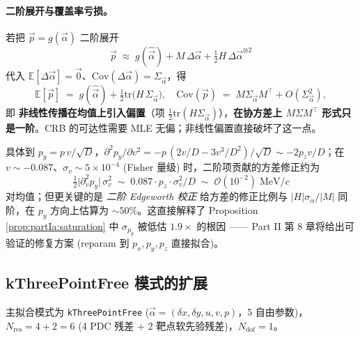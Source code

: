 \paragraph{二阶展开与覆盖率亏损。}
若把 $\vec p=g(\vec\alpha)$ 二阶展开
\begin{equation}
  \vec p \;\approx\; g(\hat{\vec\alpha}) + M\,\Delta\vec\alpha + \tfrac12 H\,\Delta\vec\alpha^{\otimes 2}
\end{equation}
代入 $\mathbb E[\Delta\vec\alpha]=\vec 0$、$\mathrm{Cov}(\Delta\vec\alpha)=\Sigma_{\vec\alpha}$，得
\begin{equation}
  \mathbb E[\vec p] \;=\; g(\hat{\vec\alpha}) + \tfrac12\mathrm{tr}\!\bigl(H\,\Sigma_{\vec\alpha}\bigr),
  \quad
  \mathrm{Cov}(\vec p)\;=\;M\Sigma_{\vec\alpha}M^\top + O(\Sigma_{\vec\alpha}^2),
  \label{eq:partIa:fisher:nonlin_bias}
\end{equation}
即 \textbf{非线性传播在均值上引入偏置}（项 $\tfrac12\mathrm{tr}(H\Sigma_{\vec\alpha})$），\textbf{在协方差上 $M\Sigma M^\top$ 形式只是一阶}。CRB 的可达性需要 MLE 无偏；非线性偏置直接破坏了这一点。

具体到 $p_y=p\,v/\sqrt D$，$\partial^2 p_y/\partial v^2=-p\,(2v/D-3v^3/D^2)/\sqrt D\sim-2p_z v/D$；在 $v\sim-0.087$、$\sigma_v\sim 5\times 10^{-4}$ (Fisher 量级) 时，二阶项贡献的方差修正约为
\begin{equation}
  \tfrac12\bigl|\partial^2_v p_y\bigr|\,\sigma_v^2 \;\sim\; 0.087\cdot p_z\cdot\sigma_v^2/D
  \;\sim\;\mathcal O(10^{-2})\;\mathrm{MeV}/c
\end{equation}
对均值；但更关键的是 \emph{二阶 Edgeworth 校正} 给方差的修正比例与 $|H|\sigma_\alpha/|M|$ 同阶，在 $p_y$ 方向上估算为 $\sim 50\%$。这直接解释了 Proposition \ref{prop:partIa:saturation} 中 $\sigma_{p_y}$ 被低估 $1.9\times$ 的根因 —— Part II 第 8 章将给出可验证的修复方案 (reparam 到 $p_x,p_y,p_z$ 直接拟合)。

\subsection{kThreePointFree 模式的扩展}
\label{sec:partIa:fisher:5dof}

主拟合模式为 \texttt{kThreePointFree} ($\vec\alpha=(\delta x,\delta y,u,v,p)$，5 自由参数)，$N_\mathrm{res}=4+2=6$ (4 PDC 残差 + 2 靶点软先验残差)，$N_\mathrm{dof}=1$。

